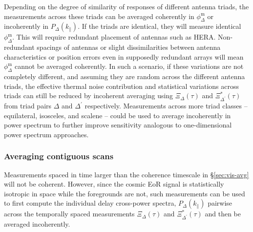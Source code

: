 \documentclass[
reprint,
superscriptaddress,
amsmath,
amssymb,
aps,
prd
]{revtex4-1}
\begin{document}
Depending on the degree of similarity of responses of different antenna triads, the measurements across these triads can be averaged coherently in $\phi_\Delta^\textrm{m}$ or incoherently in $P_\Delta(k_\parallel)$. If the triads are identical, they will measure identical $\phi_\Delta^\textrm{m}$. This will require redundant placement of antennas such as HERA. Non-redundant spacings of antennas or slight dissimilarities between antenna characteristics or position errors even in supposedly redundant arrays will mean $\phi_\Delta^\textrm{m}$ cannot be averaged coherently. %
In such a scenario, if these variations are not completely different, and assuming they are random across the different antenna triads, the effective thermal noise contribution 
and statistical variations across triads can still be reduced by incoherent averaging using 
$\Xi_\Delta(\tau)$ and $\Xi_{\Delta^\prime}^*(\tau)$ from triad pairs $\Delta$ and $\Delta^\prime$ respectively. Measurements across more triad classes -- equilateral, isosceles, and scalene -- could be used to average incoherently in power spectrum to further improve sensitivity analogous to one-dimensional power spectrum approaches. 

\subsubsection{Averaging contiguous scans}\label{sec:utc-avg}

Measurements spaced in time larger than the coherence timescale in \S\ref{sec:vis-avg} will not be coherent. 
However, since the cosmic EoR signal is statistically isotropic in space while the foregrounds are not, such measurements can be used to first compute the individual delay cross-power spectra, $P_\Delta(k_\parallel)$ pairwise across the temporally spaced measurements $\Xi_\Delta(\tau)$ and $\Xi_{\Delta^\prime}^*(\tau)$ and then be averaged incoherently. 

\end{document}
